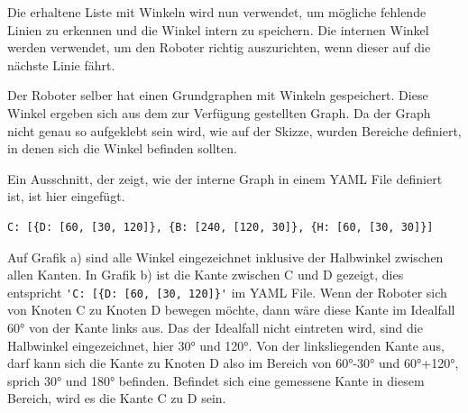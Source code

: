 Die erhaltene Liste mit Winkeln wird nun verwendet, um mögliche fehlende Linien zu erkennen und die Winkel intern zu speichern. Die internen Winkel werden verwendet, um den Roboter richtig auszurichten, wenn dieser auf die nächste Linie fährt.

Der Roboter selber hat einen Grundgraphen mit Winkeln gespeichert. Diese Winkel ergeben sich aus dem zur Verfügung gestellten Graph.
Da der Graph nicht genau so aufgeklebt sein wird, wie auf der Skizze, wurden Bereiche definiert, in denen sich die Winkel befinden sollten.

Ein Ausschnitt, der zeigt, wie der interne Graph in einem YAML File definiert ist, ist hier eingefügt.

\begin{verbatim}
C: [{D: [60, [30, 120]}, {B: [240, [120, 30]}, {H: [60, [30, 30]}]
\end{verbatim}

Auf Grafik a) sind alle Winkel eingezeichnet inklusive der Halbwinkel zwischen allen Kanten. In Grafik b) ist die Kante zwischen C und D gezeigt, dies entspricht \verb|'C: [{D: [60, [30, 120]}'| im YAML File. Wenn der Roboter sich von Knoten C zu Knoten D bewegen möchte, dann wäre diese Kante im Idealfall 60° von der Kante links aus. Das der Idealfall nicht eintreten wird, sind die Halbwinkel eingezeichnet, hier 30° und 120°. Von der linksliegenden Kante aus, darf kann sich die Kante zu Knoten D also im Bereich von 60°-30° und 60°+120°, sprich 30° und 180° befinden. Befindet sich eine gemessene Kante in diesem Bereich, wird es die Kante C zu D sein.

